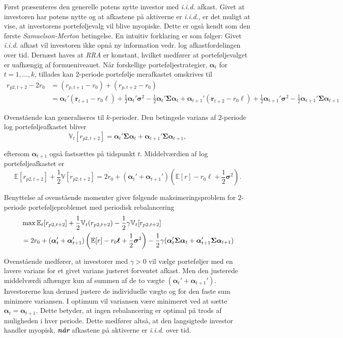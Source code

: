 \documentclass[
  a4paper,
  oneside]{memoir}
\begin{document}
Først præsenteres den generelle potens nytte investor med \emph{i.i.d.} afkast. Givet at investoren har potens nytte og at afkastene på aktiverne er \emph{i.i.d.}, er det muligt at vise, at investorens porteføljevalg vil blive myopiske. Dette er også kendt som den første \emph{Samuelson-Merton} betingelse. En intuitiv forklaring er som følger: Givet \emph{i.i.d.} afkast vil investoren ikke opnå ny information vedr. log afkastfordelingen over tid. Dernæst haves at \emph{RRA} er konstant, hvilket medfører at porteføljevalget er uafhængig af formueniveauet. Når forskellige porteføljestrategier, \(\bm{\alpha}_t\) for \(t=1,\dots,k\), tillades kan \(2\)-periode portefølje merafkastet omskrives til
\begin{align}
r_{p2,t+2}-2r_0&=(r_{p,t+1}-r_0)+(r_{p,t+2}-r_0)\\
&= \bm{\alpha}_t'(\bm{r}_{t+1}-r_0\bm{\ell})+\frac{1}{2}\bm{\alpha}_t'\bm{\sigma}^2-\frac{1}{2} \bm{\alpha}_t'\bm{\Sigma}\bm{\alpha}_t + \bm{\alpha}_{t+1}'(\bm{r}_{t+2}-r_0\bm{\ell})+\frac{1}{2}\bm{\alpha}_{t+1}'\bm{\sigma}^2-\frac{1}{2} \bm{\alpha}_{t+1}'\bm{\Sigma}\bm{\alpha}_{t+1}
\end{align}

Ovenstående kan generaliseres til \(k\)-perioder. Den betingede varians af \(2\)-periode log porteføljeafkastet bliver
\[\mathbb{V}_t[r_{p2,t+2}]=\bm{\alpha}_t'\bm{\Sigma}\bm{\alpha}_t+\bm{\alpha}_{t+1}'\bm{\Sigma}\bm{\alpha}_{t+1},\]

eftersom \(\bm{\alpha}_{t+1}\) også fastsættes på tidspunkt \(t\). Middelværdien af log porteføljeafkastet er
\[\mathbb{E}[r_{p2,t+2}]+\frac{1}{2}\mathbb{V}[r_{p2,t+2}]=2r_0 + (\bm{\alpha}_t'+\bm{\alpha}_{t+1}')(\mathbb{E}[r]-r_0\bm{\ell}+\frac{1}{2}\bm{\sigma}^2).\]

Benyttelse af ovenstående momenter giver følgende maksimeringsproblem for \(2\)-periode porteføljeproblemet med periodisk rebalancering
\begin{align}
&\max\mathbb{E}_t[r_{p2,t+2}] + \frac{1}{2} \mathbb{V}_t(r_{p2,t+2})-\frac{1}{2}\gamma \mathbb{V}_t[r_{p2,t+2}]\notag \\
&=2r_0+(\bm{\alpha}_t'+\bm{\alpha}_{t+1}')\left(\mathbb{E}[r]-r_0\bm{\ell}+\frac{1}{2}\bm{\sigma}^2\right)-\frac{1}{2}\gamma (\bm{\alpha}_t'\bm{\Sigma}\bm{\alpha}_t+\bm{\alpha}_{t+1}'\bm{\Sigma}\bm{\alpha}_{t+1})
\label{eq:CRRAmakslogk2periode}
\end{align}

Ovenstående medfører, at investorer med \(\gamma>0\) vil vælge porteføljer med en lavere varians for et givet varians justeret forventet afkast. Men den justerede middelværdi afhænger kun af summen af de to vægte \((\bm{\alpha}_t'+\bm{\alpha}_{t+1}')\). Investorerne kan dermed justere de individuelle vægte og for den faste sum minimere variansen. I optimum vil variansen være minimeret ved at sætte \(\bm{\alpha}_t=\bm{\alpha}_{t+1}\). Dette betyder, at ingen rebalancering er optimal på trods af muligheden i hver periode. Dette medfører altså, at den langsigtede investor handler myopisk, \textbf{\emph{når}} afkastene på aktiverne er \emph{i.i.d.} over tid.
\end{document}
